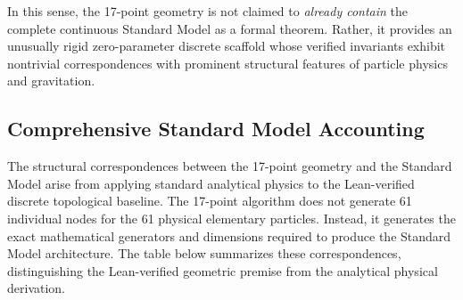 \documentclass[12pt, a4paper]{article}
\begin{document}
In this sense, the 17-point geometry is not claimed to \emph{already contain} the complete continuous Standard Model as a formal theorem. Rather, it provides an unusually rigid zero-parameter discrete scaffold whose verified invariants exhibit nontrivial correspondences with prominent structural features of particle physics and gravitation.

\subsection{Comprehensive Standard Model Accounting}
The structural correspondences between the 17-point geometry and the Standard Model arise from applying standard analytical physics to the Lean-verified discrete topological baseline. The 17-point algorithm does not generate 61 individual nodes for the 61 physical elementary particles. Instead, it generates the exact mathematical generators and dimensions required to produce the Standard Model architecture. The table below summarizes these correspondences, distinguishing the Lean-verified geometric premise from the analytical physical derivation.
\end{document}
